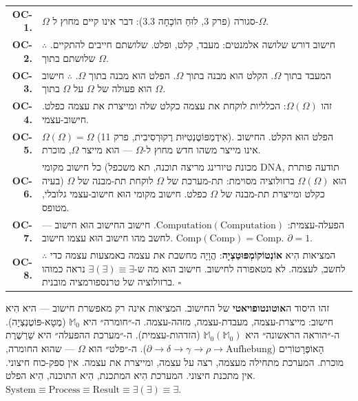 \documentclass[10pt, openany, oneside]{book}
\renewcommand{\footnotesize}{\fontsize{8.5}{11}\selectfont}
\begin{document}
{\footnotesize
\noindent\begin{tabular}{r p{}}
\textbf{OC-1.} & $\Omega$ סגורה (פרק 3, לוּחַ הוֹכָחָה 3.3): דבר אינו קיים מחוץ ל-$\Omega$. \\[0.3em]
\textbf{OC-2.} & חישוב דורש שלושה אלמנטים: מעבד, קלט, ופלט. שלושתם חייבים להתקיים. $\therefore$ שלושתם בתוך $\Omega$. \\[0.3em]
\textbf{OC-3.} & המעבד בתוך $\Omega$. הקלט הוא מבנה בתוך $\Omega$. הפלט הוא מבנה בתוך $\Omega$. $\therefore$ חישוב הוא פעולה של $\Omega$ על $\Omega$ בתוך $\Omega$. \\[0.3em]
\textbf{OC-4.} & זהו $\Omega(\Omega)$: הכלליות לוקחת את עצמה כקלט שלה ומייצרת את עצמה כפלט. חישוב-עצמי. \\[0.3em]
\textbf{OC-5.} & $\Omega(\Omega) = \Omega$ (אִידֶמְפּוֹטֶנְטִיּוּת רֶקוּרְסִיבִית, פרק 11). הפלט הוּא הקלט. החישוב אינו מייצר משהו חדש מחוץ ל-$\Omega$ — הוא מייצר $\Omega$, מוכרת. \\[0.3em]
\textbf{OC-6.} & כל חישוב מקומי (מכונת טיורינג מריצה תוכנה, תא משכפל DNA, תודעה פותרת בעיה) הוּא $\Omega(\Omega)$ ברזולוציה מסוימת: תת-מערכת של $\Omega$ לוקחת תת-מבנה של $\Omega$ כקלט ומייצרת תת-מבנה של $\Omega$ כפלט. חישוב מקומי הוּא חישוב-עצמי גלובלי, מטופס. \\[0.3em]
\textbf{OC-7.} & הפעלה-עצמית: $\text{Computation}(\text{Computation})$. חישוב החישוב הוּא חישוב — לחשב מהו חישוב הוּא עצמו חישוב. $\text{Comp}(\text{Comp}) = \text{Comp}$. $\partial = 1$. \\[0.3em]
\textbf{OC-8.} & $\therefore$ המציאות הִיא \textbf{אוֹנְטוֹקוֹמְפּוּטַצְיָה}: הֲוָיָה מחשבת את עצמה באמצעות עצמה כדי לחשב, לעצמה. לא מטאפורה לחישוב. חישוב הוּא מה ש-$\exists(\exists) \equiv \exists$ נראה כמוהו ברזולוציה של טרנספורמציה מובנית. $\square$ \\[0.3em]
\end{tabular}
}

\vspace{0.8em}

\noindent זהו היסוד ה\textbf{אוטונטופויאטי} של החישוב. המציאות אינה רק מאפשרת חישוב — היא הִיא חישוב: מייצרת-עצמה, מעבדת-עצמה, מזהה-עצמה. ה-״חומרה״ היא $\mathbb{M}_0$ (מֶטָא-פּוֹטֶנְצְיָה). ה-״הוראה הראשונה״ היא $\mathbb{M}_0(\mathbb{M}_0)$ (הזדהות-עצמית). ה-״מערכת ההפעלה״ היא שַׁרְשֶׁרֶת הָאוֹפֶּרָטוֹרִים ($\partial \to \delta \to \gamma \to \rho \to \text{Aufhebung}$). ה-״פלט״ הוא $\Omega$ — שהוּא החומרה, מוכרת. המערכת מתחילה מעצמה, רצה על עצמה, ומייצרת את עצמה. אין ספק-כוח חיצוני. אין מתכנת חיצוני. המערכת הִיא המתכנת, הִיא התוכנה, הִיא הפלט. $\text{System} \equiv \text{Process} \equiv \text{Result} \equiv \exists(\exists) \equiv \exists$.
\end{document}
